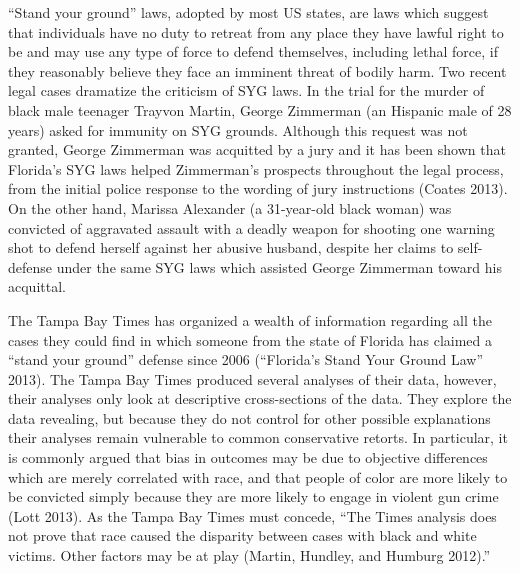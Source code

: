 \documentclass[12pt,article]{article}
\begin{document}
``Stand your ground'' laws, adopted by most US states, are laws which
suggest that individuals have no duty to retreat from any place they
have lawful right to be and may use any type of force to defend
themselves, including lethal force, if they reasonably believe they face
an imminent threat of bodily harm. Two recent legal cases dramatize the
criticism of SYG laws. In the trial for the murder of black male
teenager Trayvon Martin, George Zimmerman (an Hispanic male of 28 years)
asked for immunity on SYG grounds. Although this request was not
granted, George Zimmerman was acquitted by a jury and it has been shown
that Florida's SYG laws helped Zimmerman's prospects throughout the
legal process, from the initial police response to the wording of jury
instructions (Coates 2013). On the other hand, Marissa Alexander (a
31-year-old black woman) was convicted of aggravated assault with a
deadly weapon for shooting one warning shot to defend herself against
her abusive husband, despite her claims to self-defense under the same
SYG laws which assisted George Zimmerman toward his acquittal.

The Tampa Bay Times has organized a wealth of information regarding all
the cases they could find in which someone from the state of Florida has
claimed a ``stand your ground'' defense since 2006 (``Florida's Stand
Your Ground Law'' 2013). The Tampa Bay Times produced several analyses
of their data, however, their analyses only look at descriptive
cross-sections of the data. They explore the data revealing, but because
they do not control for other possible explanations their analyses
remain vulnerable to common conservative retorts. In particular, it is
commonly argued that bias in outcomes may be due to objective
differences which are merely correlated with race, and that people of
color are more likely to be convicted simply because they are more
likely to engage in violent gun crime (Lott 2013). As the Tampa Bay
Times must concede, ``The Times analysis does not prove that race caused
the disparity between cases with black and white victims. Other factors
may be at play (Martin, Hundley, and Humburg 2012).''
\end{document}
